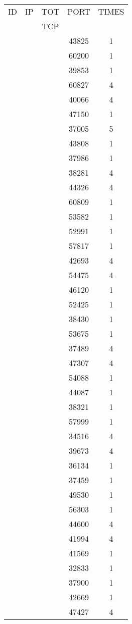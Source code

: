 \documentclass[a4paper]{scrartcl}
\begin{document}
\begin{minipage}[b]{0.5\linewidth}
\begin{tabular}{| c | c | c | c | c |}
\hline
ID & IP & TOT & PORT & TIMES \\ 
   &    & TCP &      &       \\ 
\hline
& & & 43825 & 1 \\ & & & 60200 & 1 \\ & & & 39853 & 1 \\ & & & 60827 & 4 \\ & & & 40066 & 4 \\ & & & 47150 & 1 \\ & & & 37005 & 5 \\ & & & 43808 & 1 \\ & & & 37986 & 1 \\ & & & 38281 & 4 \\ & & & 44326 & 4 \\ & & & 60809 & 1 \\ & & & 53582 & 1 \\ & & & 52991 & 1 \\ & & & 57817 & 1 \\ & & & 42693 & 4 \\ & & & 54475 & 4 \\ & & & 46120 & 1 \\ & & & 52425 & 1 \\ & & & 38430 & 1 \\ & & & 53675 & 1 \\ & & & 37489 & 4 \\ & & & 47307 & 4 \\ & & & 54088 & 1 \\ & & & 44087 & 1 \\ & & & 38321 & 1 \\ & & & 57999 & 1 \\ & & & 34516 & 4 \\ & & & 39673 & 4 \\ & & & 36134 & 1 \\ & & & 37459 & 1 \\ & & & 49530 & 1 \\ & & & 56303 & 1 \\ & & & 44600 & 4 \\ & & & 41994 & 4 \\ & & & 41569 & 1 \\ & & & 32833 & 1 \\ & & & 37900 & 1 \\ & & & 42669 & 1 \\ & & & 47427 & 4 \\ \hline\end{tabular}\end{minipage} \hfill\begin{minipage}[b]{0.5\linewidth}\begin{tabular}{| c | c | c | c | c |}

\end{tabular}
\end{minipage}
\end{document}
